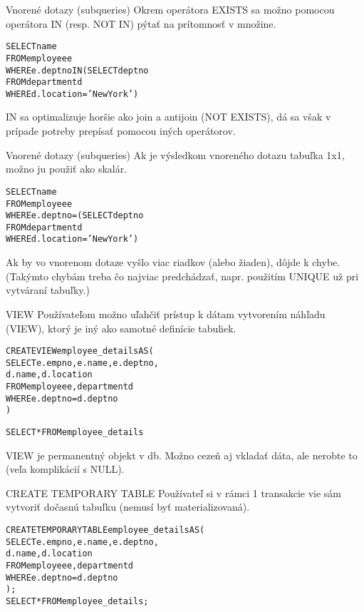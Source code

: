 \documentclass[12pt]{beamer}
\def\blue#1{\textcolor{Cerulean}{#1}}
\begin{document}
\begin{frame}[fragile]{Vnorené dotazy (subqueries)}
Okrem operátora EXISTS sa možno pomocou operátora IN (resp. NOT IN) pýtať na prítomnosť v množine.
\begin{alltt}
SELECT name
FROM employee e
WHERE e.deptno \alert{IN} (SELECT deptno
                   FROM department d
                   WHERE d.location = 'New York')
\end{alltt}
IN sa optimalizuje horšie ako join a antijoin (NOT EXISTS), dá sa však v prípade potreby prepísať pomocou iných operátorov.
\end{frame}

\begin{frame}[fragile]{Vnorené dotazy (subqueries)}
Ak je výsledkom vnoreného dotazu tabuľka 1x1, možno ju použiť ako skalár.
\begin{alltt}
SELECT name
FROM employee e
WHERE \alert{e.deptno =} \blue{(SELECT deptno
                  FROM department d
                  WHERE d.location = 'New York')}
\end{alltt}
Ak by vo vnorenom dotaze vyšlo viac riadkov (alebo žiaden), dôjde k chybe.\\
(Takýmto chybám treba čo najviac predchádzať, napr. použitím UNIQUE už pri vytváraní tabuľky.)
\end{frame}

\begin{frame}[fragile]{VIEW}
Používateľom možno uľahčiť prístup k dátam vytvorením náhľadu (VIEW), ktorý je iný ako samotné definície tabuliek.
\begin{alltt}
\alert{CREATE VIEW} \blue{employee_details} AS (
    SELECT e.empno, e.name, e.deptno,
           d.name, d.location
    FROM employee e, department d
    WHERE e.deptno = d.deptno
)

SELECT * FROM \blue{employee_details}
\end{alltt}
VIEW je permanentný objekt v db. Možno cezeň aj vkladať dáta, ale nerobte to (veľa komplikácií s NULL).
\end{frame}

\begin{frame}[fragile]{CREATE TEMPORARY TABLE}
Používateľ si v rámci 1 transakcie vie sám vytvoriť dočasnú tabuľku (nemusí byť materializovaná).
\begin{alltt}
\alert{CREATE TEMPORARY TABLE} \blue{employee_details} AS (
    SELECT e.empno, e.name, e.deptno,
           d.name, d.location
    FROM employee e, department d
    WHERE e.deptno = d.deptno
);
SELECT * FROM \blue{employee_details};
\end{alltt}
\end{frame}
\end{document}
